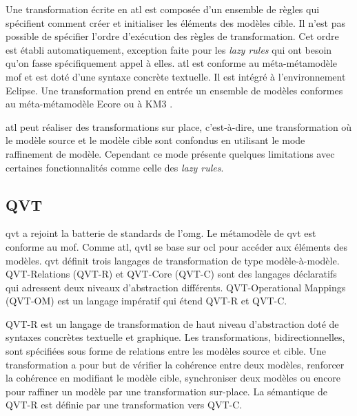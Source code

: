 Une transformation écrite en \gls{atl} est composée d'un ensemble de règles qui 
spécifient comment créer et initialiser les éléments des modèles cible. Il n'est 
pas possible de spécifier l'ordre d'exécution des règles de transformation. Cet 
ordre est établi automatiquement, exception faite pour les \textit{lazy rules} 
qui ont besoin qu'on fasse spécifiquement appel à elles. \gls{atl} est conforme au 
méta-métamodèle \gls{mof} et est doté d'une syntaxe concrète textuelle. Il est intégré 
à l'environnement Eclipse. Une transformation prend en entrée un ensemble de 
modèles conformes au méta-métamodèle Ecore ou à KM3 \cite{jouault2006km3}.


\gls{atl} peut réaliser des transformations sur place, c'est-à-dire, une 
transformation où le modèle source et le modèle cible sont confondus en 
utilisant le mode raffinement de modèle. Cependant ce mode présente quelques 
limitations avec certaines fonctionnalités comme celle des \textit{lazy rules}.

\subsection{QVT}
\gls{qvt} \cite{kurtev2008state} \cite{omg2011meta} a rejoint la batterie de standards de l'\gls{omg}. Le métamodèle de \gls{qvt} est conforme au \gls{mof}. Comme \gls{atl}, \gls{qvtl} se base sur \gls{ocl} pour accéder aux éléments des modèles.
\gls{qvt} définit trois langages de transformation de type modèle-à-modèle. 
QVT-Relations (QVT-R) et QVT-Core (QVT-C) sont des langages déclaratifs qui 
adressent deux niveaux d'abstraction différents. QVT-Operational Mappings 
(QVT-OM) est un langage impératif qui étend QVT-R et QVT-C.

QVT-R est un langage de transformation de haut niveau d'abstraction doté de 
syntaxes concrètes textuelle et graphique. Les transformations, 
bidirectionnelles, sont spécifiées sous forme de relations entre les modèles 
source et cible. Une transformation a pour but de vérifier la cohérence entre 
deux modèles, renforcer la cohérence en modifiant le modèle cible, synchroniser 
deux modèles ou encore pour raffiner un modèle par une transformation sur-place. 
La sémantique de QVT-R est définie par une transformation vers QVT-C.

